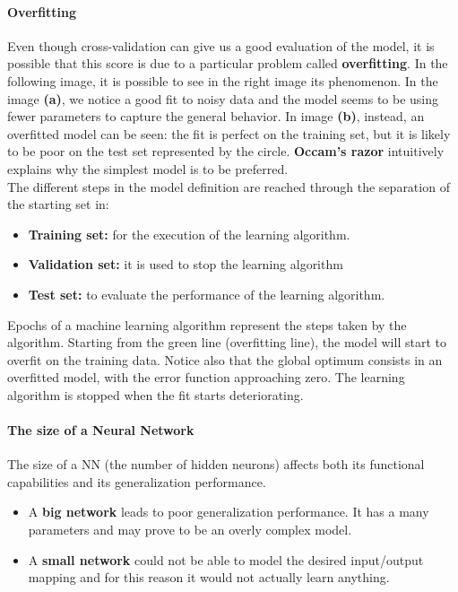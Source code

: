 \paragraph{Overfitting}
Even though cross-validation can give us a good evaluation of the model, it is possible that this score is due to a particular problem called \textbf{overfitting}. In the following image, it is possible to see in the right image its phenomenon.
In the image \textbf{(a)}, we notice a good fit to noisy data and the model seems to be using fewer parameters to capture the general behavior. In image \textbf{(b)}, instead, an overfitted model can be seen: the fit is perfect on the training set, but it is likely to be poor on the test set represented by the circle. \textbf{Occam's razor} intuitively explains why the simplest model is to be preferred.\\
The different steps in the model definition are reached through the separation of the starting set in:
\begin{itemize}
	\item \textbf{Training set:} for the execution of the learning algorithm.
	\item \textbf{Validation set:} it is used to stop the learning algorithm
	\item \textbf{Test set:} to evaluate the performance of the learning algorithm.
\end{itemize}
Epochs of a machine learning algorithm represent the steps taken by the algorithm. Starting from the green line (overfitting line), the model will start to overfit on the training data. Notice also that the global optimum consists in an overfitted model, with the error function approaching zero.
The learning algorithm is stopped when the fit starts deteriorating.

\paragraph*{The size of a Neural Network} 
The size of a NN (the number of hidden neurons) affects both its functional capabilities and its generalization performance.
\begin{itemize}
	\item A \textbf{big network} leads to poor generalization performance. It has a many parameters and may prove to be an overly complex model.
	\item A \textbf{small network} could not be able to model the desired input/output mapping and for this reason it would not actually learn anything.
\end{itemize}

